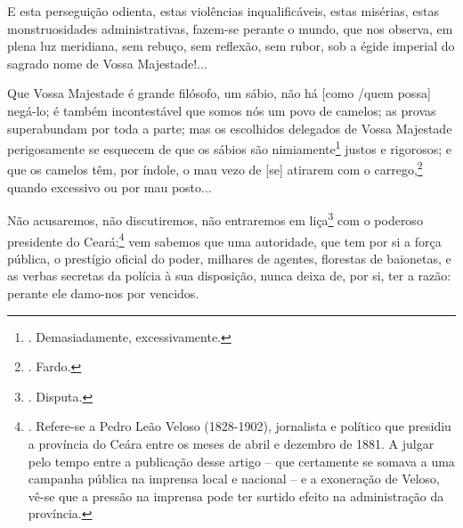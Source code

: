 E esta perseguição odienta, estas violências inqualificáveis, estas
misérias, estas monstruosidades administrativas, fazem-se perante o
mundo, que nos observa, em plena luz meridiana, sem rebuço, sem
reflexão, sem rubor, sob a égide imperial do sagrado nome de Vossa
Majestade!...

Que Vossa Majestade é grande filósofo, um sábio, não há {[}como /quem
possa{]} negá-lo; é também incontestável que somos nós um povo de
camelos; as provas superabundam por toda a parte; mas os escolhidos
delegados de Vossa Majestade perigosamente se esquecem de que os sábios
são nimiamente\footnote{. Demasiadamente, excessivamente.} justos e
rigorosos; e que os camelos têm, por índole, o mau vezo de {[}se{]}
atirarem com o carrego,\footnote{. Fardo.} quando excessivo ou por mau
posto...

Não acusaremos, não discutiremos, não entraremos em liça\footnote{.
  Disputa.} com o poderoso presidente do Ceará;\footnote{. Refere-se a
  Pedro Leão Veloso (1828-1902), jornalista e político que presidiu a
  província do Ceára entre os meses de abril e dezembro de 1881. A
  julgar pelo tempo entre a publicação desse artigo -- que certamente se
  somava a uma campanha pública na imprensa local e nacional -- e a
  exoneração de Veloso, vê-se que a pressão na imprensa pode ter surtido
  efeito na administração da província.} vem sabemos que uma autoridade,
que tem por si a força pública, o prestígio oficial do poder, milhares
de agentes, florestas de baionetas, e as verbas secretas da polícia à
sua disposição, nunca deixa de, por si, ter a razão: perante ele
damo-nos por vencidos.

